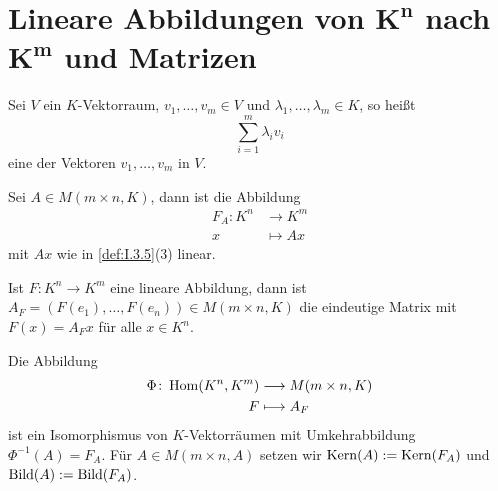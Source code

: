 \section{Lineare Abbildungen von $\mathbf{K^n}$ nach $\mathbf{K^m}$ und Matrizen}

\begin{definition}[Linearkombination]
	\label{def:I.6.1}
	Sei $V$ ein $K$-Vektorraum, $v_1,\dots,v_m \in V$ und $\lambda_1,\dots,\lambda_m \in K$, so heißt
	\[
		\sum_{i=1}^{m} \lambda_i v_i
	\]
	eine  der Vektoren $v_1,\dots,v_m$ in $V$.
\end{definition}

\setcounter{definition}{2}
\begin{lemma}
	\label{lemma:I.6.3}
	Sei $A \in M(m \times n,K)$, dann ist die Abbildung
	\begin{align*}
		F_A \colon K^n &\longrightarrow K^m \\
		x &\longmapsto Ax
	\end{align*}
	mit $Ax$ wie in \autoref{def:I.3.5}(3) linear.
\end{lemma}

\begin{satz}
	\label{satz:I.6.4}
	Ist $F\colon K^n \rightarrow K^m$ eine lineare Abbildung, dann ist $A_F = (F(e_1),\dots,F(e_n)) \in M(m\times n,K)$ die eindeutige Matrix mit $F(x) = A_F x$ für alle $x \in K^n$.
\end{satz}

\setcounter{definition}{5}
\begin{satz}
	\label{satz:I.6.6}
	Die Abbildung
	\begin{align*}
		\Phi \colon \operatorname{Hom}(K^n,K^m) &\longrightarrow M(m \times n,K) \\
		F &\longmapsto A_F
	\end{align*}
	ist ein Isomorphismus von $K$-Vektorräumen mit Umkehrabbildung $\Phi^{-1}(A) = F_A$.
	Für $A \in M(m\times n,A)$ setzen wir $\operatorname{Kern}(A) := \operatorname{Kern}(F_A)$ und $\operatorname{Bild}(A) := \operatorname{Bild}(F_A)$.
\end{satz}

